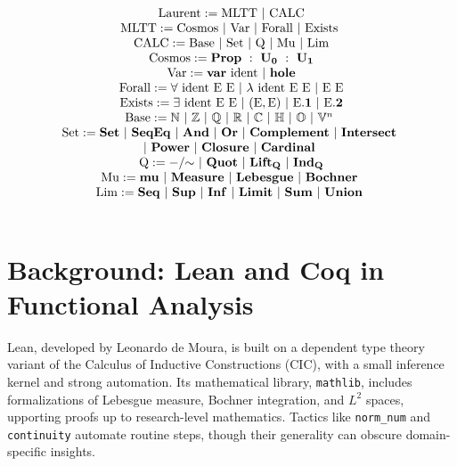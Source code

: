 \documentclass[12pt,twoside,draft]{cmpart}
\begin{document}
$$
\begin{array}{c} \\
   \mathrm{Laurent} := \mathrm{MLTT}\ |\ \mathrm{CALC} \\
   \mathrm{MLTT} := \mathrm{Cosmos}\ |\ \mathrm{Var}\ |\ \mathrm{Forall}\ |\ \mathrm{Exists}\ \\
   \mathrm{CALC} := \mathrm{Base}\ |\ \mathrm{Set}\ |\ \mathrm{Q}\ |\ \mathrm{Mu}\ |\ \mathrm{Lim} \\
   \mathrm{Cosmos} := \mathbf{Prop}\ :\ \mathbf{U_0}\ :\ \mathbf{U_1} \\
   \mathrm{Var} := \mathbf{var}\ \mathrm{ident}\ |\ \mathbf{hole} \\
   \mathrm{Forall} := \forall\ \mathrm{ident}\ \mathrm{E}\ \mathrm{E}\ |\ \lambda\ \mathrm{ident}\ \mathrm{E}\ \mathrm{E}\ |\ \mathrm{E}\ \mathrm{E} \\
   \mathrm{Exists} := \exists\ \mathrm{ident}\ \mathrm{E}\ \mathrm{E}\ |\ (\mathrm{E}, \mathrm{E})\ |\ \mathrm{E}\mathbf{.1}\ |\ \mathrm{E}\mathbf{.2} \\
   \mathrm{Base} := \mathbb{N}\ |\ \mathbb{Z}\ |\ \mathbb{Q}\ |\ \mathbb{R}\ |\ \mathbb{C}\ |\ \mathbb{H}\ |\ \mathbb{O}\ |\ \mathbb{V}^n\ \\
   \mathrm{Set} := \mathbf{Set}\ |\ \mathbf{SeqEq}\ |\ \mathbf{And}\ |\ \mathbf{Or}\ 
                |\ \mathbf{Complement}\ |\ \mathbf{Intersect}\ \\
                |\ \mathbf{Power}\ |\ \mathbf{Closure}\ |\ \mathbf{Cardinal}\ \\
   \mathrm{Q} := \mathbf{-/\hspace{-1mm}\sim}\ |\ \mathbf{Quot}\ |\ \mathbf{Lift_Q}\ |\ \mathbf{Ind_Q} \\
   \mathrm{Mu} := \mathbf{mu}\ |\ \mathbf{Measure}\ 
                |\ \mathbf{Lebesgue}\ |\ \mathbf{Bochner}\ \\
   \mathrm{Lim} := \mathbf{Seq}\ |\ \mathbf{Sup}\ |\ \mathbf{Inf}\ 
               |\ \mathbf{Limit}\ |\ \mathbf{Sum}\ |\ \mathbf{Union}\ \\
         \\
\end{array}
$$

\section{Background: Lean and Coq in Functional Analysis}
Lean, developed by Leonardo de Moura, is built on a dependent type theory variant
of the Calculus of Inductive Constructions (CIC), with a small inference kernel
and strong automation. Its mathematical library, \texttt{mathlib},
includes formalizations of Lebesgue measure, Bochner integration, and $L^2$ spaces,
upporting proofs up to research-level mathematics.
Tactics like \texttt{norm\_num} and \texttt{continuity} automate routine steps,
though their generality can obscure domain-specific insights.
\end{document}
